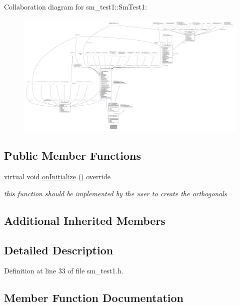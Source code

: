 Collaboration diagram for sm\+\_\+test1\+:\+:Sm\+Test1\+:
\nopagebreak
\begin{figure}[H]
\begin{center}
\leavevmode
\includegraphics[width=350pt]{structsm__test1_1_1SmTest1__coll__graph}
\end{center}
\end{figure}
\subsection*{Public Member Functions}
\begin{DoxyCompactItemize}
\item 
virtual void \hyperlink{structsm__test1_1_1SmTest1_a139efa6ce29dc01aeebc4d5b4b6ecf44}{on\+Initialize} () override
\begin{DoxyCompactList}\small\item\em this function should be implemented by the user to create the orthogonals \end{DoxyCompactList}\end{DoxyCompactItemize}
\subsection*{Additional Inherited Members}


\subsection{Detailed Description}


Definition at line 33 of file sm\+\_\+test1.\+h.



\subsection{Member Function Documentation}
\mbox{\label{structsm__test1_1_1SmTest1_a139efa6ce29dc01aeebc4d5b4b6ecf44}} 
